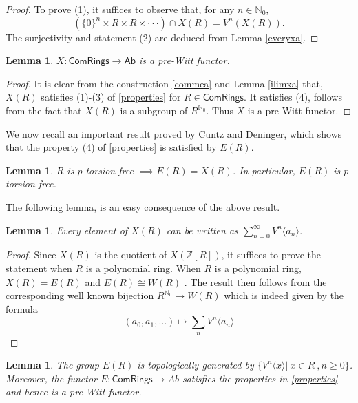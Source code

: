 \documentclass[10pt]{amsart}
\theoremstyle{plain}
\newtheorem{lemma}[thm]{Lemma}
\theoremstyle{definition}
\newcommand{\N}{{\mathbb N}}
\newcommand{\Z}{{\mathbb Z}}
\newcommand{\ab}[1]{\langle {#1} \rangle}
\newcommand{\Com}{{\mathsf{ComRings}}}
\begin{document}
\begin{proof} To prove (1), it suffices to observe that, for any $n \in \N_0$,
$$ (\{0\}^n \times R \times R \times \cdot \cdot \cdot ) \cap X(R) = V^n(X(R)).$$ 
The surjectivity and statement (2) are deduced from Lemma \eqref{everyxa}. 
\end{proof}

\begin{lemma}\label{xisprewitt} $X : \Com \to \mathsf{Ab}$ is a pre-Witt functor.
\end{lemma}
\begin{proof} It is clear from the construction \ref{commea} and Lemma \ref{ilimxa} that,  $X(R)$ satisfies (1)-(3) of \ref{properties} for $R \in \Com$. It satisfies (4), follows from the fact that $X(R)$ is a subgroup of $R^{\N_0}$. Thus $X$ is a pre-Witt functor.
\end{proof}

\noindent We now recall an important result proved by Cuntz and Deninger, which shows that the property (4) of \ref{properties} is satisfied by $E(R)$.
\begin{lemma}\cite[Cor. 2.10]{cd}\label{property4}
$R$ is $p$-torsion free $\implies E(R) = X(R)$. In particular, $E(R)$ is $p$-torsion free. 
\end{lemma}
The following lemma, is an easy consequence of the above result. 
\begin{lemma}\label{everyxa}
Every element of $X(R)$ can be written as $\sum_{n=0}^\infty V^n\ab{a_n}$. 
\end{lemma}
\begin{proof}
Since $X(R)$ is the quotient of $X(\Z[R])$, it suffices to prove the statement when $R$ is a polynomial ring. When $R$ is a polynomial ring, $X(R) = E(R)$ \cite[Cor. 2.10]{cd} and $E(R)\cong W(R)$ \cite[page 561]{cd}. The result then follows from the corresponding well known bijection $R^{\N_0}\to W(R)$ which is indeed given by the formula $$(a_0, a_1,...) \mapsto \sum_{n} V^n\ab{a_n}$$ 
\end{proof}

\begin{lemma}\label{ertopgen}
The group $E(R)$ is topologically generated by $\{V^n\ab{x}|\ x\in R \ ,n\geq 0\}$. Moreover, the functor $E: \Com \to Ab$ satisfies the properties in \ref{properties} and hence is a pre-Witt functor.
\end{lemma}
\end{document}
